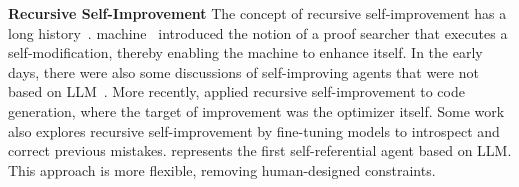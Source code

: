\noindent\textbf{Recursive Self-Improvement} \quad
The concept of recursive self-improvement has a long history~\citep{good1966speculations,schmidhuber1987evolutionary}.  \godel machine~\citep{schmidhuber2003godel} introduced the notion of a proof searcher that executes a self-modification, thereby enabling the machine to enhance itself.
In the early days, there were also some discussions of self-improving agents that were not based on LLM~\citep{hall2007self,steunebrink2012towards}.
More recently, \citet{zelikman2023self} applied recursive self-improvement to code generation, where the target of improvement was the optimizer itself.
Some work~\citep{havrilla2024glorewhenwhereimprove,qu2024recursiveintrospectionteachinglanguage,kumar2024traininglanguagemodelsselfcorrect} also explores recursive self-improvement by fine-tuning models to introspect and correct previous mistakes.
\framework represents the first self-referential agent based on LLM. This approach is more flexible, removing human-designed constraints.
